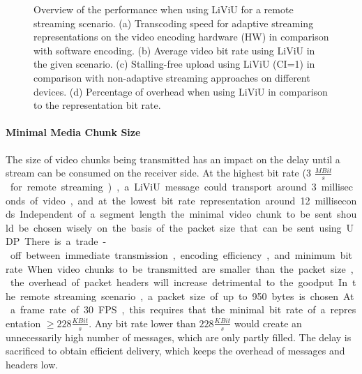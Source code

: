 \begin{figure}
\caption[LiViU's performance in the remote streaming scenario]{Overview of the performance when using LiViU for a remote streaming scenario. (a) Transcoding speed for adaptive streaming representations on the video encoding hardware (HW) in comparison with software encoding. (b) Average video bit rate using LiViU in the given scenario. (c) Stalling-free upload using LiViU (CI=1) in comparison with non-adaptive streaming approaches on different devices. (d) Percentage of overhead when using LiViU in comparison to the representation bit rate.}
\label{fig:530_bitrate_comparison}
\end{figure}
\paragraph{Minimal Media Chunk Size}
The size of video chunks being transmitted has an impact on the delay until a stream can be consumed on the receiver side.
At the highest bit rate (3 \unit{$\frac{MBit}{s}$} for remote streaming), a \ac{LiViU} message could transport around 3 milliseconds of video, and at the lowest bit rate representation around 12 milliseconds.
Independent of a segment length the minimal video chunk to be sent should be chosen wisely on the basis of the packet size that can be sent using \ac{UDP}.
There is a trade-off between immediate transmission, encoding efficiency, and minimum bit rate.
When video chunks to be transmitted are smaller than the packet size, the overhead of packet headers will increase detrimental to the goodput.
In the remote streaming scenario, a packet size of up to 950 bytes is chosen.
At a frame rate of 30 \unit{FPS}, this requires that the minimal bit rate of a representation $\geq 228 \unit{\frac{KBit}{s}}$.
Any bit rate lower than $228 \unit{\frac{KBit}{s}}$ would create an unnecessarily high number of messages, which are only partly filled.
The delay is sacrificed to obtain efficient delivery, which keeps the overhead of messages and headers low.
